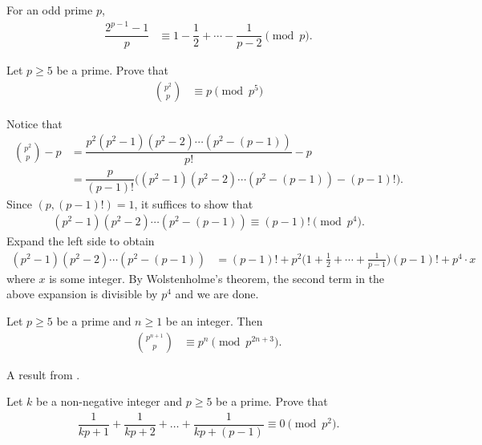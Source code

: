 \documentclass[12pt]{subfile}
\begin{document}
		\begin{corollary}
			For an odd prime $p$,
				\begin{align*}
					\dfrac{2^{p-1}-1}{p}
						& \equiv1-\dfrac{1}{2}+\cdots-\dfrac{1}{p-2}\pmod p.
				\end{align*}
		\end{corollary}

		\begin{problem}
			Let $p \geq 5$ be a prime. Prove that
				\begin{align*}
					\binom{p^2}{p}
						& \equiv p \pmod{p^5}
				\end{align*}
		\end{problem}

		\begin{solution}
			Notice that
				\begin{align*}
					\binom{p^2}{p} - p
						& =\dfrac{p^2(p^2-1)(p^2-2)\cdots(p^2-(p-1))}{p!}-p\\
						& =\dfrac{p}{(p-1)!} \Big((p^2-1)(p^2-2)\cdots(p^2-(p-1)) - (p-1)!\Big).
				\end{align*}
			Since $(p, (p-1)!)=1$, it suffices to show that
				\begin{align*}
					(p^2-1)(p^2-2)\cdots(p^2-(p-1)) \equiv (p-1)! \pmod{p^4}.
				\end{align*}
			Expand the left side to obtain
				\begin{align*}
					(p^2-1)(p^2-2)\cdots(p^2-(p-1))
						& = (p-1)! + p^2\Big(1+\frac{1}{2}+\cdots+\frac{1}{p-1}\Big)\left(p-1\right)!+p^4\cdot x
				\end{align*}
			where $x$ is some integer. By Wolstenholme's theorem, the second term in the above expansion is divisible by $p^4$ and we are done.
		\end{solution}

		\begin{corollary}
			Let $p \geq 5$ be a prime and $n\geq 1$ be an integer. Then
				\begin{align*}
					\binom{p^{n+1}}{p}
						& \equiv p^n \pmod{p^{2n+3}}.
				\end{align*}
		\end{corollary}
	A result from \textcite{carlitz_1954}.
		\begin{problem}
			Let $k$ be a non-negative integer and $p\geq 5$ be a prime. Prove that
				\begin{align*}
					\dfrac{1}{kp+1}+ \dfrac{1}{kp+2}+ \ldots+\dfrac{1}{kp+(p-1)}\equiv 0\pmod{p^2}.
				\end{align*}
		\end{problem}
\end{document}
